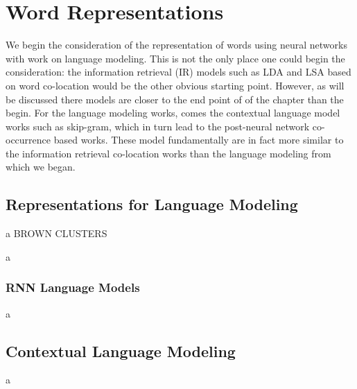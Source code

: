 \documentclass[parskip]{komatufte}
\begin{document}
\chapter{Word Representations}\label{sec:word-representations}


We begin the consideration of the representation of words using neural networks with work on language modeling.
This is not the only place one could begin the consideration: the information retrieval (IR) models such as LDA and LSA based on word co-location would be the other obvious starting point.
However, as will be discussed there models are closer to the end point of of the chapter than the begin.
For the language modeling works, comes the contextual language model works such as skip-gram, which in turn lead to the post-neural network co-occurrence based works.
These model fundamentally are in fact more similar to the information retrieval co-location works than the language modeling from which we began.


\section{Representations for Language Modeling}
 a
BROWN CLUSTERS

 a



\subsection{RNN Language Models}
 a

\section{Contextual Language Modeling}

 a
\end{document}
